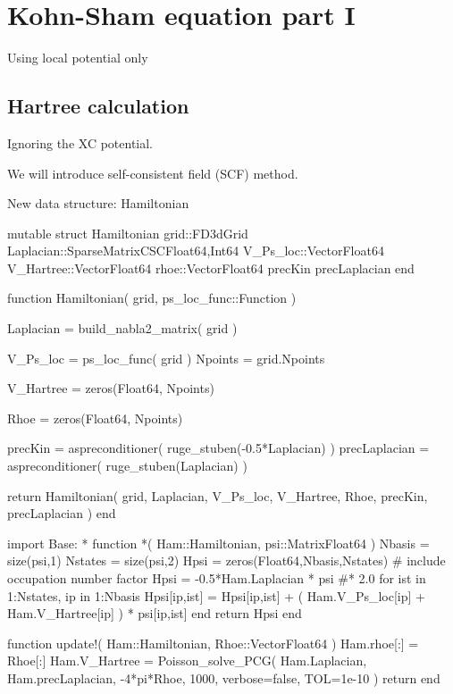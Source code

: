 \chapter{Kohn-Sham equation part I}

Using local potential only

\section{Hartree calculation}

Ignoring the XC potential.

We will introduce self-consistent field (SCF) method.

New data structure: Hamiltonian

\begin{juliacode}
mutable struct Hamiltonian
  grid::FD3dGrid
  Laplacian::SparseMatrixCSC{Float64,Int64}
  V_Ps_loc::Vector{Float64}
  V_Hartree::Vector{Float64}
  rhoe::Vector{Float64}
  precKin
  precLaplacian
end
\end{juliacode}

\begin{juliacode}
function Hamiltonian( grid, ps_loc_func::Function )
    
  Laplacian = build_nabla2_matrix( grid )
    
  V_Ps_loc = ps_loc_func( grid )
  Npoints = grid.Npoints
    
  V_Hartree = zeros(Float64, Npoints)

  Rhoe = zeros(Float64, Npoints)

  precKin = aspreconditioner( ruge_stuben(-0.5*Laplacian) )
  precLaplacian = aspreconditioner( ruge_stuben(Laplacian) )
    
  return Hamiltonian( grid, Laplacian, V_Ps_loc, V_Hartree, Rhoe, precKin, precLaplacian )
end
\end{juliacode}


\begin{juliacode}
import Base: *
function *( Ham::Hamiltonian, psi::Matrix{Float64} )
  Nbasis = size(psi,1)
  Nstates = size(psi,2)
  Hpsi = zeros(Float64,Nbasis,Nstates)
  # include occupation number factor
  Hpsi = -0.5*Ham.Laplacian * psi #* 2.0
  for ist in 1:Nstates, ip in 1:Nbasis
    Hpsi[ip,ist] = Hpsi[ip,ist] + ( Ham.V_Ps_loc[ip] + Ham.V_Hartree[ip] ) * psi[ip,ist]
  end
  return Hpsi
end
\end{juliacode}

\begin{juliacode}
function update!( Ham::Hamiltonian, Rhoe::Vector{Float64} )
  Ham.rhoe[:] = Rhoe[:]
  Ham.V_Hartree = Poisson_solve_PCG(
      Ham.Laplacian, Ham.precLaplacian, -4*pi*Rhoe, 1000,
      verbose=false, TOL=1e-10
  )
  return
end
\end{juliacode}

